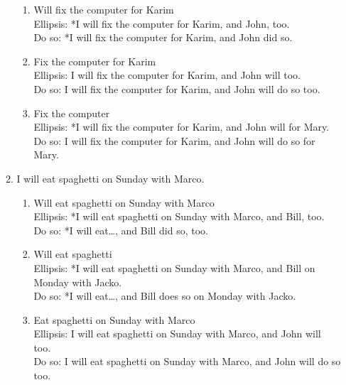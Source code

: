 \documentclass[a4paper,12pt]{article}
\begin{document}
\begin{enumerate}
\begin{enumerate}[label=(\alph*)]
         \begin{enumerate}[label=(\roman*)]
            \item Will fix the computer for Karim\\
               Ellipsis: *I will fix the computer for Karim, and John, too.\\
               Do so: *I will fix the computer for Karim, and John did so.

            \item Fix the computer for Karim\\
               Ellipsis: I will fix the computer for Karim, and John will too.\\
               Do so: I will fix the computer for Karim, and John will do so too.

            \item Fix the computer\\
               Ellipsis: *I will fix the computer for Karim, and John will for Mary.\\
               Do so: I will fix the computer for Karim, and John will do so for Mary.
         \end{enumerate}
         
      \item I will eat spaghetti on Sunday with Marco.
         \begin{enumerate}[label=(\roman*)]
            \item Will eat spaghetti on Sunday with Marco\\
               Ellipsis: *I will eat spaghetti on Sunday with Marco, and Bill, too.\\
               Do so: *I will eat\dots, and Bill did so, too.
            
            \item Will eat spaghetti\\
               Ellipsis: *I will eat spaghetti on Sunday with Marco, and Bill on Monday with Jacko.\\
               Do so: *I will eat\dots, and Bill does so on Monday with Jacko.
               
            \item Eat spaghetti on Sunday with Marco\\
               Ellipsis: I will eat spaghetti on Sunday with Marco, and John will too.\\
               Do so: I will eat spaghetti on Sunday with Marco, and John will do so too.


\end{enumerate}
\end{enumerate}
\end{enumerate}
\end{document}
